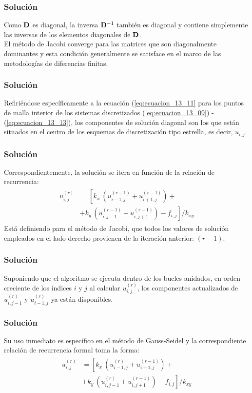 \documentclass[12pt]{beamer}
\begin{document}
\begin{frame}
\frametitle{Solución}
Como $\vb{D}$ es diagonal, la inversa $\vb{D}^{-1}$ también es diagonal y contiene simplemente las inversas de los elementos diagonales de $\vb{D}$.
\\
\bigskip
\pause
El método de Jacobi converge para las matrices que son diagonalmente dominantes y esta condición generalmente se satisface en el marco de las metodologías de diferencias finitas.
\end{frame}
\begin{frame}
\frametitle{Solución}
Refiriéndose específicamente a la ecuación (\ref{eq:ecuacion_13_11} para los puntos de malla interior de los sistemas discretizados (\ref{eq:ecuacion_13_09}) - (\ref{eq:ecuacion_13_13}), los componentes de solución diagonal son los que están situados en el centro de los esquemas de discretización tipo estrella, es decir, $u_{i,j}$.
\end{frame}
\begin{frame}
\frametitle{Solución}
Correspondientemente, la solución se itera en función de la relación de recurrencia:
\pause
\begin{align}
\begin{aligned}
u_{i,j}^{(r)} &= \left[ k_{x} \: \left( u_{i-1,j}^{(r-1)} + u_{i+1, j}^{(r-1)} \right) + \right. \\
&+ \left. k_{y} \: \left( u_{i,j-1}^{(r-1)} + u_{i, j+1}^{(r-1)} \right) - f_{i,j} \right] / k_{xy}
\end{aligned}
\label{eq:ecuacion_13_22} 	
\end{align}
\pause
Está definiendo para el método de Jacobi, que todos los valores de solución empleados en el lado derecho provienen de la iteración anterior: $(r - 1)$.
\end{frame}
\begin{frame}
\frametitle{Solución}
Suponiendo que el algoritmo se ejecuta dentro de los bucles anidados, en orden creciente de los índices $i$ y $j$ al calcular $u_{i,j}^{(r)}$, los componentes actualizados de $u_{i, j-1}^{(r)}$ y $u_{i-1, j}^{(r)}$ ya están disponibles.
\end{frame}
\begin{frame}
\frametitle{Solución}
Su uso inmediato es específico en el método de Gauss-Seidel y la correspondiente relación de recurrencia formal toma la forma:
\pause
\begin{align}
\begin{aligned}
u_{i,j}^{(r)} &= \left[ k_{x} \: \left( u_{i-1,j}^{(r)} + u_{i+1, j}^{(r-1)} \right) + \right. \\
&+ \left. k_{y} \: \left( u_{i,j-1}^{(r)} + u_{i, j+1}^{(r-1)} \right) - f_{i,j} \right] / k_{xy}
\end{aligned}
\label{eq:ecuacion_13_23} 	
\end{align}
\end{frame}
\end{document}
